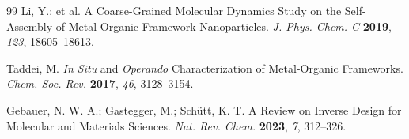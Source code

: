 \documentclass[12pt,a4paper]{article}
\begin{document}
\begin{thebibliography}{99}
 Li, Y.; et al. A Coarse-Grained Molecular Dynamics Study on the Self-Assembly of Metal-Organic Framework Nanoparticles. \textit{J. Phys. Chem. C} \textbf{2019}, \textit{123}, 18605–18613.

 Taddei, M. \textit{In Situ} and \textit{Operando} Characterization of Metal-Organic Frameworks. \textit{Chem. Soc. Rev.} \textbf{2017}, \textit{46}, 3128–3154.

 Gebauer, N. W. A.; Gastegger, M.; Schütt, K. T. A Review on Inverse Design for Molecular and Materials Sciences. \textit{Nat. Rev. Chem.} \textbf{2023}, \textit{7}, 312–326.

\end{thebibliography}
\end{document}
